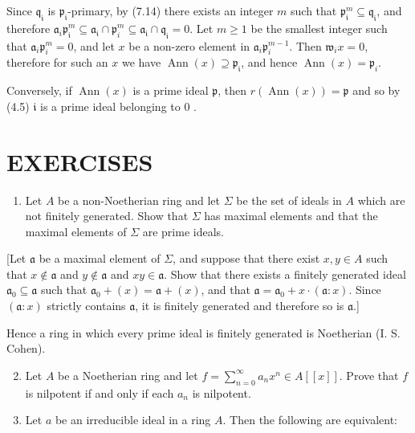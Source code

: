\documentclass{standalone}
\theoremstyle{definition}
\theoremstyle{remark}
\begin{document}
Since $\mathfrak{q}_{\mathfrak{i}}$ is $\mathfrak{p}_{\mathfrak{i}}$-primary, by (7.14) there exists an integer $m$ such that $\mathfrak{p}_{\mathfrak{i}}^{m} \subseteq \mathfrak{q}_{\mathfrak{i}}$, and therefore $\mathfrak{a}_{i} \mathfrak{p}_{\mathfrak{i}}^{m} \subseteq \mathfrak{a}_{\mathfrak{i}} \cap \mathfrak{p}_{i}^{m} \subseteq \mathfrak{a}_{\mathfrak{i}} \cap \mathfrak{q}_{\mathfrak{i}}=0$. Let $m \geqslant 1$ be the smallest integer such that $\mathfrak{a}_{i} \mathfrak{p}_{i}^{m}=0$, and let $x$ be a non-zero element in $\mathfrak{a}_{i} \mathfrak{p}_{i}^{m-1}$. Then $\mathfrak{w}_{i} x=0$, therefore for such an $x$ we have $\operatorname{Ann}(x) \supseteq \mathfrak{p}_{\mathfrak{i}}$, and hence $\operatorname{Ann}(x)=\mathfrak{p}_{i}$.

Conversely, if $\operatorname{Ann}(x)$ is a prime ideal $\mathfrak{p}$, then $r(\operatorname{Ann}(x))=\mathfrak{p}$ and so by (4.5) $\mathfrak{i}$ is a prime ideal belonging to 0 .

\section{EXERCISES}
\begin{enumerate}
  \item Let $A$ be a non-Noetherian ring and let $\Sigma$ be the set of ideals in $A$ which are not finitely generated. Show that $\Sigma$ has maximal elements and that the maximal elements of $\Sigma$ are prime ideals.
\end{enumerate}

[Let $\mathfrak{a}$ be a maximal element of $\Sigma$, and suppose that there exist $x, y \in A$ such that $x \notin \mathfrak{a}$ and $y \notin \mathfrak{a}$ and $x y \in \mathfrak{a}$. Show that there exists a finitely generated ideal $\mathfrak{a}_{0} \subseteq \mathfrak{a}$ such that $\mathfrak{a}_{0}+(x)=\mathfrak{a}+(x)$, and that $\mathfrak{a}=\mathfrak{a}_{0}+x \cdot(\mathfrak{a}: x)$. Since $(\mathfrak{a}: x)$ strictly contains $\mathfrak{a}$, it is finitely generated and therefore so is $\mathfrak{a}$.]

Hence a ring in which every prime ideal is finitely generated is Noetherian (I. S. Cohen).

\begin{enumerate}
  \setcounter{enumi}{1}
  \item Let $A$ be a Noetherian ring and let $f=\sum_{n=0}^{\infty} a_{n} x^{n} \in A[[x]]$. Prove that $f$ is nilpotent if and only if each $a_{n}$ is nilpotent.

  \item Let $a$ be an irreducible ideal in a ring $A$. Then the following are equivalent:

\end{enumerate}
\end{document}
